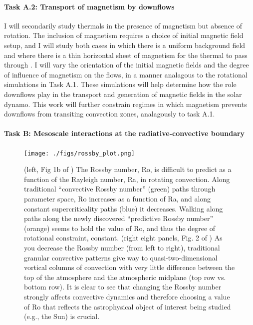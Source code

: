 \documentclass[aasms,11pt, longbibliography]{article}
\begin{document}
\paragraph{Task A.2: Transport of magnetism by downflows}
\label{sct:taskA2}
I will secondarily study thermals in the presence of magnetism but absence of rotation.
The inclusion of magnetism requires a choice of initial magnetic field setup, and I will study both cases in which there is a uniform background field and where there is a thin horizontal sheet of magnetism for the thermal to pass through \citep[as in][]{tobias&all1998}.
I will vary the orientation of the initial magnetic fields and the degree of influence of magnetism on the flows, in a manner analagous to the rotational simulations in Task A.1.
These simulations will help determine how the role downflows play in the transport and generation of magnetic fields in the solar dynamo.
This work will further constrain regimes in which magnetism prevents downflows from transiting convection zones, analagously to task A.1. 


\paragraph{\fontsize{12.5pt}{14pt}\selectfont Task B: Mesoscale interactions at the radiative-convective boundary}
\normalsize
\label{sct:taskB}
\begin{figure}[t!]
    \texttt{[image: ./figs/rossby\_plot.png]}
    \caption{(left, Fig 1b of \citet{anders&all2019}) The Rossby number, Ro, is difficult to predict as a function of the Rayleigh number, Ra, in rotating convection.
	Along traditional ``convective Rossby number'' (green) paths through parameter space, Ro increases as a function of Ra, and along constant supercriticality paths (blue) it decreases.
	Walking along paths along the newly discovered ``predictive Rossby number'' (orange) seems to hold the value of Ro, and thus the degree of rotational constraint, constant.
	(right eight panels, Fig. 2 of \citet{anders&all2019}) As you decrease the Rossby number (from left to right), traditional granular convective patterns give way to quasi-two-dimensional vortical columns of convection with very little difference between the top of the atmosphere and the atmospheric midplane (top row vs. bottom row).
	It is clear to see that changing the Rossby number strongly affects convective dynamics and therefore choosing a value of Ro that reflects the astrophysical object of interest being studied (e.g., the Sun) is crucial.
	\label{fig:rossby_plot} }
\end{figure}
\end{document}
